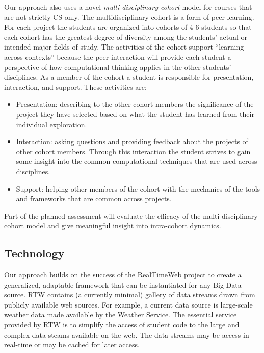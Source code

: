 \documentclass[11pt]{article}
\begin{document}
Our approach also uses a novel \textit{multi-disciplinary cohort} model for courses that are not strictly CS-only. The multidisciplinary cohort is a form of peer learning\cite{herrington-instructional}. For each project the students are organized into cohorts of 4-6 students so that each cohort has the greatest degree of diversity among the students' actual or intended major fields of study.  The activities of the cohort support ``learning across contexts'' because the peer interaction will provide each student a perspective of how computational thinking applies in the other students' disciplines. As a member of the cohort a student is responsible for presentation, interaction, and support. These activities are:

\begin{itemize}
	\item Presentation: describing to the other cohort members the significance of the project they have selected based on what the student has learned from their individual exploration.
	\item Interaction: asking questions and providing feedback about the projects of other cohort members. Through this interaction the student strives to gain some insight into the common computational techniques that are used across disciplines.
	\item Support: helping other members of the cohort with the mechanics of the tools and frameworks that are common across projects.
\end{itemize}

Part of the planned assessment will evaluate the efficacy of the multi-disciplinary cohort model and give meaningful insight into intra-cohort dynamics.

\subsection{Technology}

Our approach builds on the success of the RealTimeWeb project to create a generalized, adaptable framework that can be instantiated for any Big Data source. RTW contains (a currently minimal) gallery of data streams drawn from publicly available web sources. For example, a current data source is large-scale weather data made available by the Weather Service. The essential service provided by RTW is to simplify the access of student code to the large and complex data steams available on the web. The data streams may be access in real-time or may be cached for later access. 
\end{document}
